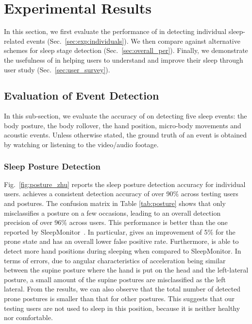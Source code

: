 \section{Experimental Results}\label{sec:4experiment}
In this section, we first evaluate the performance of \systemname in detecting individual sleep-related events
(Sec.~\ref{sec:exp:individuals}). We then compare \systemname against alternative schemes for sleep stage detection
(Sec.~\ref{sec:overall_per}). Finally, we demonstrate the usefulness of \systemname in helping users to understand and improve their sleep
through user study (Sec.~\ref{sec:user_survey}).

\subsection{Evaluation of Event Detection\label{sec:exp:individuals}}
In this sub-section, we evaluate the accuracy of \systemname on detecting five sleep events: the body posture, the body rollover, the hand
position, micro-body movements and acoustic events. Unless otherwise stated, the ground truth of an event is obtained by watching or
listening to the video/audio footage.



\subsubsection{Sleep Posture Detection}
\label{subsub:bodyposture} Fig.~\ref{fig:posture_zhu} reports the sleep posture detection accuracy for individual users. \systemname
achieves a consistent detection accuracy of over 90\% across testing users and postures. The confusion matrix in Table \ref{tab:posture}
shows that \systemname only misclassifies a posture on a few occasions, leading to an overall detection precision of over 96\% across
users. This performance is better than the one reported by SleepMonitor~\cite{sleepmonitor}. In particular, {\systemname} gives an
improvement of 5\% for the prone state and has an overall lower false positive rate. Furthermore, {\systemname} is able to detect more hand
positions during sleeping when compared to SleepMonitor. In terms of errors, due to angular characteristics of acceleration being similar
between the supine posture where the hand is put on the head and the left-lateral posture, a small amount of the supine postures are
misclassified as the left lateral. From the results, we can also observe that the total number of detected prone postures is smaller than
that for other postures. This suggests that our testing users are not used to sleep in this position, because it is neither healthy nor
comfortable.






